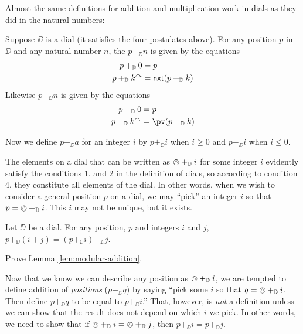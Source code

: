 Almost the same definitions for addition and multiplication work in dials as they did in the natural numbers:

\begin{defn}
	Suppose $\DD$ is a dial (it satisfies the four postulates above). For any position $p$ in $\DD$ and any natural number $n$, the  $p+_\DD n$ is given by the equations
	\begin{align*}
		p +_{\mathbb D} 0 &= p\\
		p +_{\mathbb D} k^\curvearrowright &= {\mathord{\textsf{nxt}}}(p+_{\mathbb D} k)
	\end{align*}
	Likewise $p -_\DD n$ is given by the equations
	\begin{align*}
	p -_\DD 0 &= p\\
	p -_\DD k^\nxt &= \pv(p-_\DD k)
	\end{align*}
\end{defn}

Now we define $p +_\DD a$ for an integer $i$ by $p +_\DD i$ when $i\geq 0$ and $p -_\DD i$ when $i \leq 0$.

The elements on a dial that can be written as $\owedge +_{\mathbb D} i$ for some integer $i$ evidently satisfy the conditions 1. and 2 in the definition of dials, so according to condition 4, they constitute all elements of the dial.   
In other words, when we wish to consider a general position $p$ on a dial, we may ``pick'' an integer $i$ so that $p = \owedge +_{\mathbb D} i$. This $i$ may not be unique, but it exists.

\begin{lem}\label{lem:modular-addition}
	Let $\DD$ be a dial. For any position, $p$ and integers $i$ and $j$,
	$p +_\DD (i+j) = (p +_\DD i) +_\DD j$.
\end{lem}



\begin{exer}
	\begin{exercise}
		\item Prove Lemma \ref{lem:modular-addition}.
	\end{exercise}
\end{exer}

Now that we know we can describe any position as $\owedge +_{\mathbb D} i$, we are tempted to define addition of \emph{positions} ($p +_\DD q$) by saying ``pick some $i$ so that $q = \owedge +_{\mathbb D} i$. Then define $p+_\DD q$ to be equal to $p +_\DD i$.'' That, however, is \emph{not} a definition unless we can show that the result does not depend on which $i$ we pick. In other words, we need to show that if $\owedge +_{\mathbb D} i = \owedge +_{\mathbb D} j$, then $p +_\DD i = p +_\DD j$.

